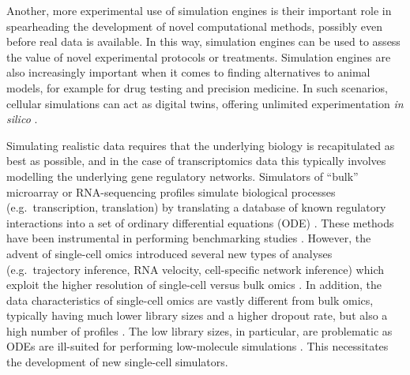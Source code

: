 \documentclass[
  table,
  10pt,
  a4paper]{article}
\begin{document}
Another, more experimental use of simulation engines is their important
role in spearheading the development of novel computational methods,
possibly even before real data is available. In this way, simulation
engines can be used to assess the value of novel experimental protocols
or treatments. Simulation engines are also increasingly important when
it comes to finding alternatives to animal models, for example for drug
testing and precision medicine. In such scenarios, cellular simulations
can act as digital twins, offering unlimited experimentation \emph{in
silico} \autocite{bjornsson_digitaltwinspersonalize_2019}.

Simulating realistic data requires that the underlying biology is
recapitulated as best as possible, and in the case of transcriptomics
data this typically involves modelling the underlying gene regulatory
networks. Simulators of ``bulk'' microarray or RNA-sequencing profiles
simulate biological processes (e.g.~transcription, translation) by
translating a database of known regulatory interactions into a set of
ordinary differential equations (ODE)
\autocite{roy_systemgeneratingtranscription_2008,hache_gengesystematicgeneration_2009,schaffter_genenetweaversilicobenchmark_2011,vandenbulcke_syntrengeneratorsynthetic_2006}.
These methods have been instrumental in performing benchmarking studies
\autocite{prill_rigorousassessmentsystems_2010,marbach_revealingstrengthsweaknesses_2010,marbach_wisdomcrowdsrobust_2012}.
However, the advent of single-cell omics introduced several new types of
analyses (e.g.~trajectory inference, RNA velocity, cell-specific network
inference) which exploit the higher resolution of single-cell versus
bulk omics \autocite{luecken_currentbestpractices_2019}. In addition,
the data characteristics of single-cell omics are vastly different from
bulk omics, typically having much lower library sizes and a higher
dropout rate, but also a high number of profiles
\autocite{vallejos_normalizingsinglecellrna_2017}. The low library
sizes, in particular, are problematic as ODEs are ill-suited for
performing low-molecule simulations
\autocite{gillespie_exactstochasticsimulation_1977}. This necessitates
the development of new single-cell simulators.
\end{document}
